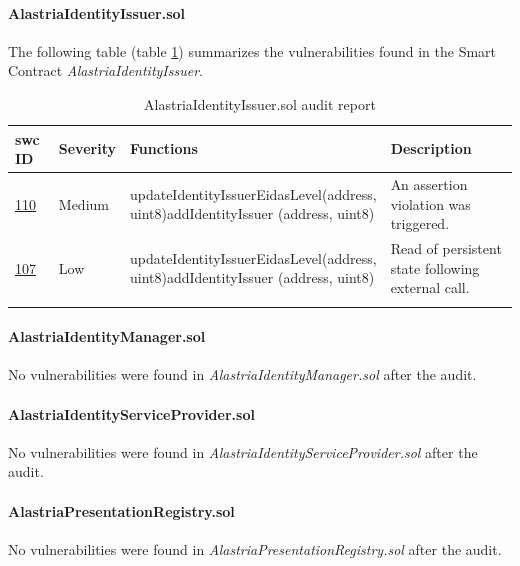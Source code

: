 \documentclass[a4paper, 12pt]{article} %
\begin{document}
            \paragraph{AlastriaIdentityIssuer.sol}
                The following table (table \ref{tab:AlastriaIdentityIssuer}) summarizes the vulnerabilities found in the Smart Contract \textit{AlastriaIdentityIssuer}.
                \begin{longtable}{||p{0.1\linewidth} | p{0.11\linewidth} | p{0.45\linewidth} | p{0.35\linewidth}||}
                    \hline
                    \textbf{\acrshort{swc} ID} & \textbf{Severity} & \textbf{Functions} & \textbf{Description} \\ [0.5ex] 
                    \hline\hline
                    \href{https://swcregistry.io/docs/SWC-110}{110} & Medium & updateIdentityIssuerEidasLevel\newline (address, uint8)\newline addIdentityIssuer (address, uint8) & An assertion violation was triggered.\\
                    \hline
                    \href{https://swcregistry.io/docs/SWC-107}{107} & Low & updateIdentityIssuerEidasLevel\newline (address, uint8)\newline addIdentityIssuer (address, uint8) & Read of persistent state following external call.\\ [1ex] 
                    \hline
                    \caption{AlastriaIdentityIssuer.sol audit report}
                    \label{tab:AlastriaIdentityIssuer}
                \end{longtable}
                
            \paragraph{AlastriaIdentityManager.sol}
                No vulnerabilities were found in \textit{AlastriaIdentityManager.sol} after the audit.
                
            \paragraph{AlastriaIdentityServiceProvider.sol}
                No vulnerabilities were found in \textit{AlastriaIdentityServiceProvider.sol} after the audit.
                
            \paragraph{AlastriaPresentationRegistry.sol}
                No vulnerabilities were found in \textit{AlastriaPresentationRegistry.sol} after the audit.
                
\end{document}

